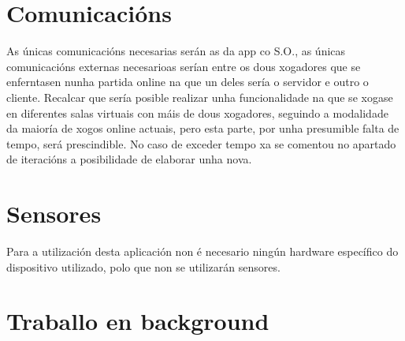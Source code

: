 \section {Comunicacións}
As únicas comunicacións necesarias serán as da app co S.O., as únicas comunicacións externas necesarioas serían entre os dous xogadores que se enferntasen nunha partida online na que un deles sería o servidor e outro o cliente. Recalcar que sería posible realizar unha funcionalidade na que se xogase en diferentes salas virtuais con máis de dous xogadores, seguindo a modalidade da maioría de xogos online actuais, pero esta parte, por unha presumible falta de tempo, será prescindible. No caso de exceder tempo xa se comentou no apartado de iteracións a posibilidade de elaborar unha nova.

\section {Sensores}
Para a utilización desta aplicación non é necesario ningún hardware específico do dispositivo utilizado, polo que non se utilizarán sensores. 

\section {Traballo en background} 





\let\cleardoublepage=\clearpage